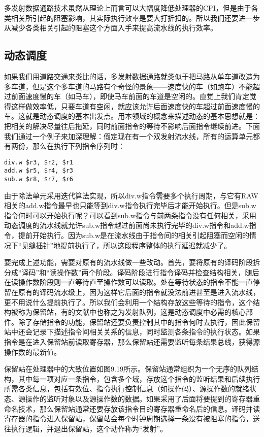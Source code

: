 \documentclass[]{ctexbook}
\begin{document}
多发射数据通路技术虽然从理论上而言可以大幅度降低处理器的CPI，但是由于各类相关所引起的阻塞影响，其实际执行效率是要大打折扣的。所以我们还要进一步从减少各类相关引起的阻塞这个方面入手来提高流水线的执行效率。

\hypertarget{sec-dynamic}{%
\subsection{动态调度}\label{sec-dynamic}}

如果我们用道路交通来类比的话，多发射数据通路就类似于把马路从单车道改造为多车道，但是这个多车道的马路有个奇怪的景象------速度快的车（如跑车）不能超过前面速度慢的车（如马车），即使马车前面的车道是空闲的。直觉上我们肯定觉得这样做效率低，只要车道有空闲，就应该允许后面速度快的车超过前面速度慢的车。这就是动态调度的基本出发点。用本领域的概念来描述动态的基本思想就是：把相关的解决尽量往后拖延，同时前面指令的等待不影响后面指令继续前进。下面我们通过一个例子来加深理解：假定现在有一个双发射流水线，所有的运算单元都有两份，那么在执行下列指令序列时：

\begin{verbatim}
div.w $r3, $r2, $r1
add.w $r5, $r4, $r3
sub.w $r8, $r7, $r6
\end{verbatim}

由于除法单元采用迭代算法实现，所以div.w指令需要多个执行周期，与它有RAW相关的add.w指令最早也只能等到div.w指令执行完毕后才能开始执行。但是sub.w指令何时可以开始执行呢？可以看到sub.w指令与前两条指令没有任何相关，采用动态调度的流水线就允许sub.w指令越过前面尚未执行完毕的div.w指令和add.w指令，提前开始执行。因为sub.w是在流水线由于指令间的相关引起阻塞而空闲的情况下``见缝插针''地提前执行了，所以这段程序整体的执行延迟就减少了。

要完成上述功能，需要对原有的流水线做一些改动。首先，要将原有的译码阶段拆分成``译码''和``读操作数''两个阶段。译码阶段进行指令译码并检查结构相关，随后在读操作数阶段则一直等待直至操作数可以读取。处在等待状态的指令不能一直停留在原有的译码流水级上，因为这样它后面的指令就没法前进甚至是进入流水线，更不用说什么提前执行了。所以我们会利用一个结构存放这些等待的指令，这个结构被称为保留站，有的文献中也称之为发射队列，这是动态调度中必需的核心部件。除了存储指令的功能，保留站还要负责控制其中的指令何时去执行，因此保留站中还会记录下描述指令间相关关系的信息，同时监测各条指令的执行状态。如果指令是在进入保留站前读取寄存器，那么保留站还需要监听每条结果总线，获得源操作数的最新值。

保留站在处理器中的大致位置如图9.19所示。保留站通常组织为一个无序的队列结构，其中每一项对应一条指令，包含多个域，存放这个指令的监听结果和后续执行所需各类信息，包括有效位、指令执行控制信息（如操作码）、源操作数的就绪状态、源操作的监听对象以及源操作数的数据。如果采用了后面将要提到的寄存器重命名技术，那么保留站通常还要存放该指令目的寄存器重命名后的信息。译码并读寄存器的指令进入保留站，保留站会每个时钟周期选择一条没有被阻塞的指令，送往执行逻辑，并退出保留站，这个动作称为``发射''。
\end{document}
